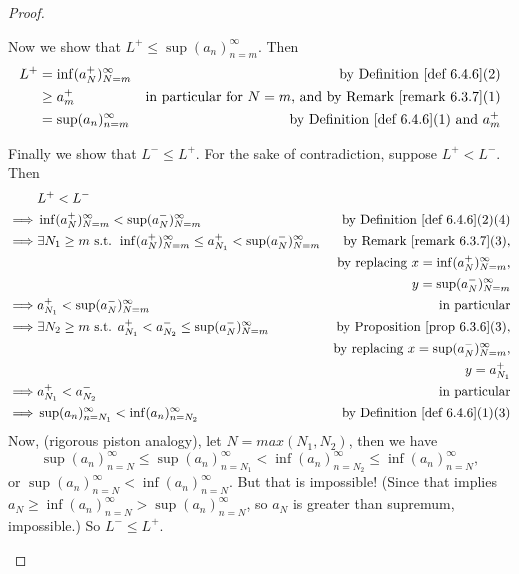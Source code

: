 \begin{proof}
\begin{enumerate}
      Now we show that \(L^+ \le \sup(a_n)_{n = m}^{\infty}\).
      Then
      \begin{align*}
        L^+ & = \inf(a_N^+)_{N = m}^{\infty} & \text{by \DEF{6.4.6}(2)} \\
            & \ge a_m^+ & \text{in particular for \(N = m\), and by \RMK{6.3.7}(1)} \\
            & = \sup(a_n)_{n = m}^{\infty} & \text{by \DEF{6.4.6}(1) and \(a_m^+\)}
      \end{align*}
      
      Finally we show that \(L^- \le L^+\).
      For the sake of contradiction, suppose \(L^+ < L^-\).
      Then
      \begin{align*}
                 & L^+ < L^- \\
        \implies & \inf(a_N^+)_{N = m}^{\infty} < \sup(a_N^-)_{N = m}^{\infty} & \text{by \DEF{6.4.6}(2)(4)} \\
        \implies & \exists N_1 \ge m \text{ s.t. } \inf(a_N^+)_{N = m}^{\infty} \le a_{N_1}^+ < \sup(a_N^-)_{N = m}^{\infty} & \text{by \RMK{6.3.7}(3),} \\
                 & & \text{by replacing \(x = \inf(a_N^+)_{N = m}^{\infty}\),} \\
                 & & \text{\(y = \sup(a_N^-)_{N = m}^{\infty}\)} \\
        \implies & a_{N_1}^+ < \sup(a_N^-)_{N = m}^{\infty} & \text{in particular} \\
        \implies & \exists N_2 \ge m \text{ s.t. } a_{N_1}^+ < a_{N_2}^- \le \sup(a_N^-)_{N = m}^{\infty} & \text{by \PROP{6.3.6}(3),} \\
                 & & \text{by replacing \(x = \sup(a_N^-)_{N = m}^{\infty}\),} \\
                 & & \text{\(y = a_{N_1}^+\)} \\
        \implies & a_{N_1}^+ < a_{N_2}^- & \text{in particular} \\
        \implies & \sup(a_n)_{n = N_1}^{\infty} < \inf(a_n)_{n = N_2}^{\infty} & \text{by \DEF{6.4.6}(1)(3)} \\
      \end{align*}
      Now, (rigorous piston analogy), let \(N = max(N_1, N_2)\), then we have
      \[
        \sup(a_n)_{n = N}^{\infty} \le \sup(a_n)_{n = N_1}^{\infty} < \inf(a_n)_{n = N_2}^{\infty} \le \inf(a_n)_{n = N}^{\infty},
      \]
      or \(\sup(a_n)_{n = N}^{\infty} < \inf(a_n)_{n = N}^{\infty}\).
      But that is impossible! (Since that implies \(a_N \ge \inf(a_n)_{n = N}^{\infty} > \sup(a_n)_{n = N}^{\infty}\), so \(a_N\) is greater than supremum, impossible.)
      So \(L^- \le L^+\).


\end{enumerate}
\end{proof}
